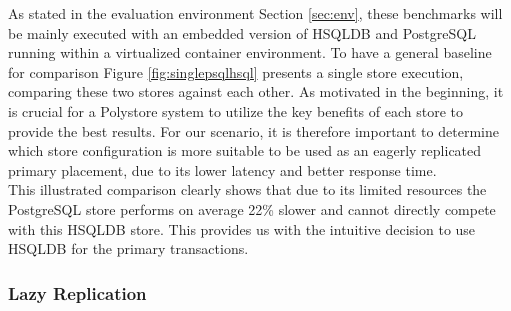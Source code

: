 As stated in the evaluation environment Section \ref{sec:env}, these benchmarks will be mainly executed with an embedded version of HSQLDB and PostgreSQL running within a virtualized 
container environment. To have a general baseline for comparison Figure \ref{fig:singlepsqlhsql} presents a single store execution, comparing these two stores against each other.
As motivated in the beginning, it is crucial for a Polystore system to utilize the key benefits of each store to provide the best results. For our scenario, it is therefore important to determine which 
store configuration is more suitable to be used as an eagerly replicated primary placement, due to its lower latency and better response time.\\
This illustrated comparison clearly shows that due to its limited resources the PostgreSQL store
performs on average 22\% slower and cannot directly compete with this HSQLDB store.
This provides us with the intuitive decision to use HSQLDB for the primary transactions.








\subsubsection{Lazy Replication} 


